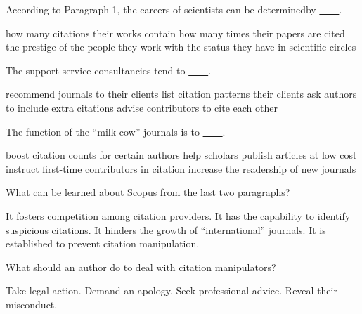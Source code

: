 \item According to Paragraph 1, the careers of scientists can be determinedby \uline{~~~~}.
\begin{tasks}
	\task how many citations their works contain
	\task how many times their papers are cited
	\task the prestige of the people they work with
	\task the status they have in scientific circles
\end{tasks}
\item The support service consultancies tend to \uline{~~~~}.
\begin{tasks}
	\task recommend journals to their clients
	\task list citation patterns their clients
	\task ask authors to include extra citations
	\task advise contributors to cite each other
\end{tasks}
\item The function of the ``milk cow'' journals is to \uline{~~~~}.
\begin{tasks}
	\task boost citation counts for certain authors
	\task help scholars publish articles at low cost
	\task instruct first-time contributors in citation
	\task increase the readership of new journals
\end{tasks}
\item What can be learned about Scopus from the last two paragraphs?
\begin{tasks}
	\task It fosters competition among citation providers.
	\task It has the capability to identify suspicious citations.
	\task It hinders the growth of ``international'' journals.
	\task It is established to prevent citation manipulation.
\end{tasks}
\item What should an author do to deal with citation manipulators?
\begin{tasks}
	\task Take legal action.
	\task Demand an apology.
	\task Seek professional advice.
	\task Reveal their misconduct.
\end{tasks}
